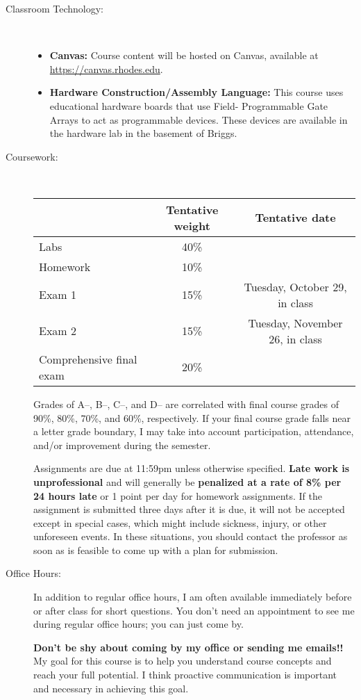 \documentclass [letterpaper,11pt]{article}
\begin{document}
\begin{description}
\item[Classroom Technology:]\
\begin{itemize}
\item \textbf{Canvas:} Course content will be hosted on Canvas, available at \url{https://canvas.rhodes.edu}.

\item \textbf{Hardware Construction/Assembly Language:} This course uses educational hardware boards that use Field-
Programmable Gate Arrays to act as programmable devices. These devices are available in the hardware lab
in the basement of Briggs.
\end{itemize}

\newpage\item[Coursework:] \

\begin{tabular}{lcc} 
& Tentative weight & Tentative date \\ \hline
Labs & 40\% & \\
Homework & 10\% & \\
Exam 1 & 15\% & Tuesday, October 29, in class \\
Exam 2 & 15\% & Tuesday, November 26, in class\\
Comprehensive final exam & 20\% 
\end{tabular}

Grades of A--, B--, C--, and D-- are correlated with final course grades of 90\%, 80\%,
70\%, and 60\%, respectively.  If your final course grade falls near a letter grade boundary,
I may take into account participation, attendance, and/or improvement during the semester.

Assignments are due at 11:59pm unless otherwise specified.  \textbf{Late work is unprofessional} and will generally be \textbf{penalized at a rate of 8\% per 24 hours late} or 1 point per day for homework assignments.  If the assignment is submitted three days after it is due, it will not be accepted except in special cases, which might include sickness, injury, or other unforeseen events. In these situations, you should contact the professor as soon as is feasible to come up with a plan for submission.

\item[Office Hours:]
In addition to regular office hours, I am often available immediately before or after class for 
short questions.  You don't need an appointment to see me during regular office hours; you
can just come by.  

\textbf{Don't be shy about coming by my office or sending me emails!!}  My goal for this course is to help you understand course concepts and reach your full potential. I think proactive communication is important and necessary in achieving this goal.


\end{description}
\end{document}
